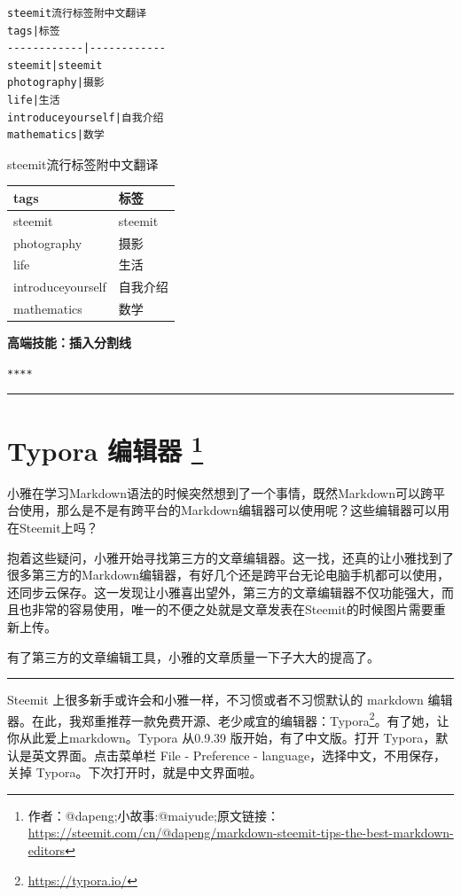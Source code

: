 \documentclass[]{ctexbook}
\renewcommand{\href}[2]{#2\footnote{\url{#1}}}
\begin{document}
\begin{verbatim}
steemit流行标签附中文翻译
tags|标签
------------|------------
steemit|steemit
photography|摄影
life|生活
introduceyourself|自我介绍
mathematics|数学
\end{verbatim}

steemit流行标签附中文翻译

\begin{longtable}[]{@{}ll@{}}
\toprule
tags & 标签\tabularnewline
\midrule
\endhead
steemit & steemit\tabularnewline
photography & 摄影\tabularnewline
life & 生活\tabularnewline
introduceyourself & 自我介绍\tabularnewline
mathematics & 数学\tabularnewline
\bottomrule
\end{longtable}

\textbf{高端技能：插入分割线}

\texttt{****}

\begin{center}\rule{0.5\linewidth}{\linethickness}\end{center}

\hypertarget{typora-}{%
\section[Typora 编辑器 ]{\texorpdfstring{Typora 编辑器 \footnote{作者：@dapeng;小故事:@maiyude;原文链接：\url{https://steemit.com/cn/@dapeng/markdown-steemit-tips-the-best-markdown-editors}}}{Typora 编辑器 }}\label{typora-}}

小雅在学习Markdown语法的时候突然想到了一个事情，既然Markdown可以跨平台使用，那么是不是有跨平台的Markdown编辑器可以使用呢？这些编辑器可以用在Steemit上吗？

抱着这些疑问，小雅开始寻找第三方的文章编辑器。这一找，还真的让小雅找到了很多第三方的Markdown编辑器，有好几个还是跨平台无论电脑手机都可以使用，还同步云保存。这一发现让小雅喜出望外，第三方的文章编辑器不仅功能强大，而且也非常的容易使用，唯一的不便之处就是文章发表在Steemit的时候图片需要重新上传。

有了第三方的文章编辑工具，小雅的文章质量一下子大大的提高了。

\begin{center}\rule{0.5\linewidth}{\linethickness}\end{center}

Steemit 上很多新手或许会和小雅一样，不习惯或者不习惯默认的 markdown 编辑器。在此，我郑重推荐一款免费开源、老少咸宜的编辑器：\href{https://typora.io/}{Typora}。有了她，让你从此爱上markdown。Typora 从0.9.39 版开始，有了中文版。打开 Typora，默认是英文界面。点击菜单栏 File - Preference - language，选择中文，不用保存，关掉 Typora。下次打开时，就是中文界面啦。
\end{document}
